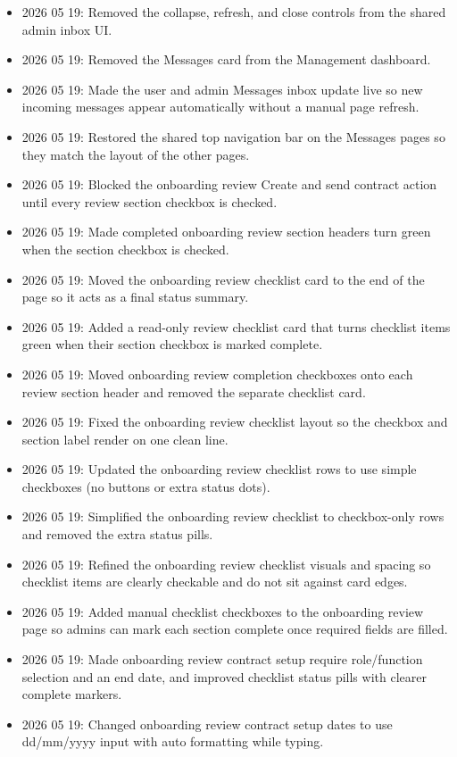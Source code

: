 \documentclass[11pt]{article}
\begin{document}
\begin{itemize}
    \item 2026 05 19: Removed the collapse, refresh, and close controls from the shared admin inbox UI.
    \item 2026 05 19: Removed the Messages card from the Management dashboard.
    \item 2026 05 19: Made the user and admin Messages inbox update live so new incoming messages appear automatically without a manual page refresh.
    \item 2026 05 19: Restored the shared top navigation bar on the Messages pages so they match the layout of the other pages.
    \item 2026 05 19: Blocked the onboarding review Create and send contract action until every review section checkbox is checked.
    \item 2026 05 19: Made completed onboarding review section headers turn green when the section checkbox is checked.
    \item 2026 05 19: Moved the onboarding review checklist card to the end of the page so it acts as a final status summary.
    \item 2026 05 19: Added a read-only review checklist card that turns checklist items green when their section checkbox is marked complete.
    \item 2026 05 19: Moved onboarding review completion checkboxes onto each review section header and removed the separate checklist card.
    \item 2026 05 19: Fixed the onboarding review checklist layout so the checkbox and section label render on one clean line.
    \item 2026 05 19: Updated the onboarding review checklist rows to use simple checkboxes (no buttons or extra status dots).
    \item 2026 05 19: Simplified the onboarding review checklist to checkbox-only rows and removed the extra status pills.
    \item 2026 05 19: Refined the onboarding review checklist visuals and spacing so checklist items are clearly checkable and do not sit against card edges.
    \item 2026 05 19: Added manual checklist checkboxes to the onboarding review page so admins can mark each section complete once required fields are filled.
    \item 2026 05 19: Made onboarding review contract setup require role/function selection and an end date, and improved checklist status pills with clearer complete markers.
    \item 2026 05 19: Changed onboarding review contract setup dates to use dd/mm/yyyy input with auto formatting while typing.

\end{itemize}
\end{document}
